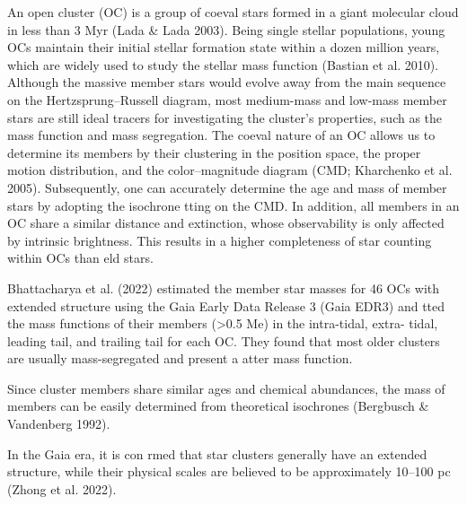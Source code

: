 \documentclass[../main.tex]{subfiles}
\begin{document}
{An open cluster (OC) is a group of coeval stars formed in a
giant molecular cloud in less than 3 Myr (Lada & Lada 2003).
Being single stellar populations, young OCs maintain their initial
stellar formation state within a dozen million years, which are
widely used to study the stellar mass function (Bastian et al.
2010). Although the massive member stars would evolve away
from the main sequence on the Hertzsprung–Russell diagram,
most medium-mass and low-mass member stars are still ideal
tracers for investigating the cluster’s properties, such as the
mass function and mass segregation. The coeval nature of an
OC allows us to determine its members by their clustering in
the position space, the proper motion distribution, and the color–magnitude diagram (CMD; Kharchenko et al. 2005).
Subsequently, one can accurately determine the age and mass of
member stars by adopting the isochrone tting on the CMD. In
addition, all members in an OC share a similar distance and
extinction, whose observability is only affected by intrinsic
brightness. This results in a higher completeness of star counting
within OCs than eld stars.

Bhattacharya et al. (2022) estimated the member
star masses for 46 OCs with extended structure using the Gaia
Early Data Release 3 (Gaia EDR3) and tted the mass
functions of their members (>0.5 Me) in the intra-tidal, extra-
tidal, leading tail, and trailing tail for each OC. They found that
most older clusters are usually mass-segregated and present a
atter mass function.

Since cluster members share similar ages and chemical
abundances, the mass of members can be easily determined
from theoretical isochrones (Bergbusch & Vandenberg 1992).

In the Gaia era, it is con rmed
that star clusters generally have an extended structure, while
their physical scales are believed to be approximately
10–100 pc (Zhong et al. 2022).

}
\end{document}
